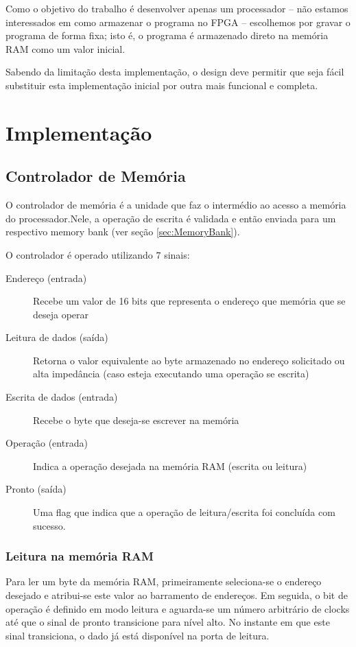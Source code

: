 \documentclass[11pt]{report}
\begin{document}
Como o objetivo do trabalho é desenvolver apenas um processador -- não estamos interessados em como armazenar o programa no FPGA -- escolhemos por gravar o programa de forma fixa; isto é, o programa é armazenado direto na memória RAM como um valor inicial.

Sabendo da limitação desta implementação, o design deve permitir que seja fácil substituir esta implementação inicial por outra mais funcional e completa.

\chapter{Implementação}

\section{Controlador de Memória}
\label{sec:MemoryController}
O controlador de memória é a unidade que faz o intermédio ao acesso a memória do processador.Nele, a operação de escrita é validada e então enviada para um respectivo memory bank (ver seção \ref{sec:MemoryBank}).

O controlador é operado utilizando $7$ sinais:

\begin{description}
	\item[Endereço (entrada)] Recebe um valor de 16 bits que representa o endereço que memória que se deseja operar
	\item[Leitura de dados (saída)] Retorna o valor equivalente ao byte armazenado no endereço solicitado ou alta impedância (caso esteja executando uma operação se escrita)
	\item[Escrita de dados (entrada)] Recebe o byte que deseja-se escrever na memória
	\item[Operação (entrada)] Indica a operação desejada na memória RAM (escrita ou leitura)
	\item[Pronto (saída)] Uma flag que indica que a operação de leitura/escrita foi concluída com sucesso.
\end{description}

\subsection{Leitura na memória RAM}
Para ler um byte da memória RAM, primeiramente seleciona-se o endereço desejado e atribui-se este valor ao barramento de endereços. Em seguida, o bit de operação é definido em modo leitura e aguarda-se um número arbitrário de clocks até que o sinal de pronto transicione para nível alto. No instante em que este sinal transiciona, o dado já está disponível na porta de leitura.
\end{document}
